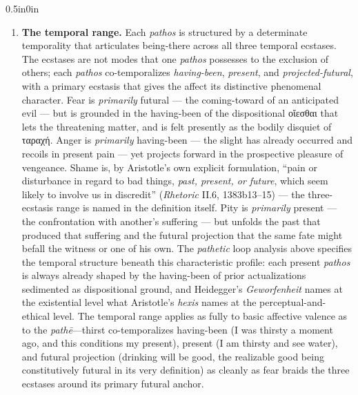 \documentclass{article}
\newcommand{\gk}[1]{{\greekfont #1}}
\begin{document}
\begin{adjustwidth}{0.5in}{0in}
\begin{enumerate}
        \item \textbf{The temporal range.} Each \textit{pathos} is structured by a determinate temporality that articulates being-there across all three temporal ecstases. The ecstases are not modes that one \textit{pathos} possesses to the exclusion of others; each \textit{pathos} co-temporalizes \textit{having-been}, \textit{present}, and \textit{projected-futural}, with a primary ecstasis that gives the affect its distinctive phenomenal character. Fear is \textit{primarily} futural --- the coming-toward of an anticipated evil --- but is grounded in the having-been of the dispositional \gk{οἴεσθαι} that lets the threatening matter, and is felt presently as the bodily disquiet of \gk{ταραχή}. Anger is \textit{primarily} having-been --- the slight has already occurred and recoils in present pain --- yet projects forward in the prospective pleasure of vengeance. Shame is, by Aristotle's own explicit formulation, ``pain or disturbance in regard to bad things, \textit{past, present, or future}, which seem likely to involve us in discredit'' (\textit{Rhetoric} II.6, 1383b13--15) --- the three-ecstasis range is named in the definition itself. Pity is \textit{primarily} present --- the confrontation with another's suffering --- but unfolds the past that produced that suffering and the futural projection that the same fate might befall the witness or one of his own. The \textit{pathetic} loop analysis above specifies the temporal structure beneath this characteristic profile: each present \textit{pathos} is always already shaped by the having-been of prior actualizations sedimented as dispositional ground, and Heidegger's \textit{Geworfenheit} names at the existential level what Aristotle's \textit{hexis} names at the perceptual-and-ethical level. The temporal range applies as fully to basic affective valence as to the \textit{pathē}---thirst co-temporalizes having-been (I was thirsty a moment ago, and this conditions my present), present (I am thirsty and see water), and futural projection (drinking will be good, the realizable good being constitutively futural in its very definition) as cleanly as fear braids the three ecstases around its primary futural anchor. 
        

\end{enumerate}
\end{adjustwidth}
\end{document}
